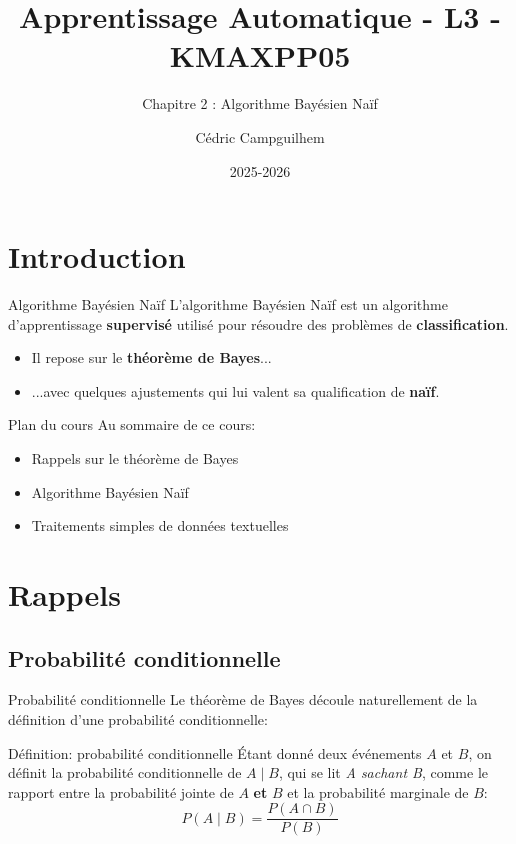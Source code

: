 \documentclass[10pt]{beamer}  %
\title{Apprentissage Automatique - L3 - KMAXPP05}
\subtitle{Chapitre 2 : Algorithme Bayésien Naïf}
\author{Cédric Campguilhem}
\institute[]{
	Airbus Operations \\
	\href{mailto:cedric.campguilhem@airbus.com}{\texttt{cedric.campguilhem@airbus.com}}
}
\date{2025-2026}
\begin{document}
	
\begin{frame}
	\titlepage
\end{frame}


\section[Introduction]{Introduction}

\begin{frame}{Algorithme Bayésien Naïf}
	L'algorithme Bayésien Naïf est un algorithme d'apprentissage \textbf{supervisé} utilisé pour résoudre des problèmes de \textbf{classification}. \\
	\pause
	\vspace{0.5cm}
	\begin{itemize}
		\item Il repose sur le \textbf{théorème de Bayes}...
		\pause
		\item ...avec quelques ajustements qui lui valent sa qualification de \textbf{naïf}.
	\end{itemize}
\end{frame}

\begin{frame}{Plan du cours}
	Au sommaire de ce cours:
	\begin{itemize}
		\item Rappels sur le théorème de Bayes
		\item Algorithme Bayésien Naïf
		\item Traitements simples de données textuelles
	\end{itemize}
\end{frame}


\section[Rappels]{Rappels}

\subsection{Probabilité conditionnelle}

\begin{frame}{Probabilité conditionnelle}
	Le théorème de Bayes découle naturellement de la définition d'une probabilité conditionnelle:
	\begin{block}{Définition: probabilité conditionnelle}
		\'Etant donné deux événements $A$ et $B$, on définit la probabilité conditionnelle de $A \mid B$, qui se lit \textit{A sachant B}, comme le rapport entre la probabilité jointe de $A$ \textbf{et} $B$ et la probabilité marginale de $B$:
		\begin{equation}
			P(A \mid B) = \displaystyle \frac{P(A \cap B)}{P(B)}
			\nonumber
		\end{equation}
	\end{block}
\end{frame}
\end{document}
